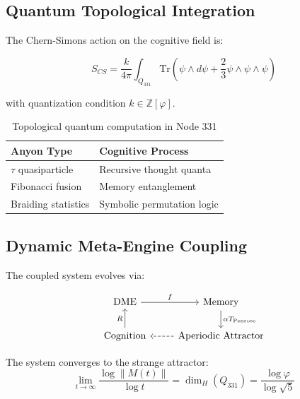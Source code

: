 \documentclass[12pt]{article}
\begin{document}
\subsection{Quantum Topological Integration}
The Chern-Simons action on the cognitive field is:

\begin{equation}
S_{CS} = \frac{k}{4\pi} \int_{Q_{331}} \text{Tr}\left(\psi \wedge d\psi + \frac{2}{3}\psi \wedge \psi \wedge \psi\right)
\end{equation}

with quantization condition $k \in \mathbb{Z}[\varphi]$.

\begin{table}[h]
\centering
\begin{tabular}{ll}
\toprule
\textbf{Anyon Type} & \textbf{Cognitive Process} \\
\midrule
$\tau$ quasiparticle & Recursive thought quanta \\
Fibonacci fusion & Memory entanglement \\
Braiding statistics & Symbolic permutation logic \\
\bottomrule
\end{tabular}
\caption{Topological quantum computation in Node 331}
\end{table}

\subsection{Dynamic Meta-Engine Coupling}
The coupled system evolves via:

\[
\begin{tikzcd}
\text{DME} \ar[r, "f"] & \text{Memory} \ar[d, "\alpha T_{\text{Penrose}}"] \\
\text{Cognition} \ar[u, "R"] & \text{Aperiodic Attractor} \ar[l, dashed]
\end{tikzcd}
\]

\begin{proposition}
The system converges to the strange attractor:
\[
\lim_{t\to\infty} \frac{\log \|M(t)\|}{\log t} = \dim_H(Q_{331}) = \frac{\log \varphi}{\log \sqrt{5}}
\]
\end{proposition}
\end{document}

